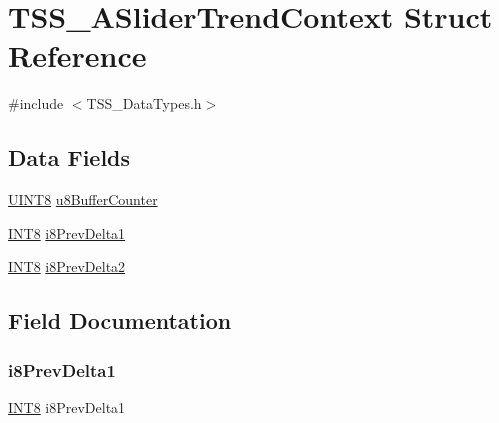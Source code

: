 \hypertarget{struct_t_s_s___a_slider_trend_context}{}\section{T\+S\+S\+\_\+\+A\+Slider\+Trend\+Context Struct Reference}
\label{struct_t_s_s___a_slider_trend_context}


{\ttfamily \#include $<$T\+S\+S\+\_\+\+Data\+Types.\+h$>$}

\subsection*{Data Fields}
\begin{DoxyCompactItemize}
\item 
\hyperlink{_t_s_s___data_types_8h_ab27e9918b538ce9d8ca692479b375b6a}{U\+I\+N\+T8} \hyperlink{struct_t_s_s___a_slider_trend_context_af49a14568842088425e14123f892f482}{u8\+Buffer\+Counter}
\item 
\hyperlink{_t_s_s___data_types_8h_a7ebe70ceca856797319175e30bcf003d}{I\+N\+T8} \hyperlink{struct_t_s_s___a_slider_trend_context_af87ae2e8b9dbc6a4da89a88b18b34eef}{i8\+Prev\+Delta1}
\item 
\hyperlink{_t_s_s___data_types_8h_a7ebe70ceca856797319175e30bcf003d}{I\+N\+T8} \hyperlink{struct_t_s_s___a_slider_trend_context_adac3dfc21b94303ae5e55264b7698f5a}{i8\+Prev\+Delta2}
\end{DoxyCompactItemize}


\subsection{Field Documentation}
\mbox{\label{struct_t_s_s___a_slider_trend_context_af87ae2e8b9dbc6a4da89a88b18b34eef}} 
\subsubsection{\texorpdfstring{i8\+Prev\+Delta1}{i8PrevDelta1}}
{\footnotesize\ttfamily \hyperlink{_t_s_s___data_types_8h_a7ebe70ceca856797319175e30bcf003d}{I\+N\+T8} i8\+Prev\+Delta1}

